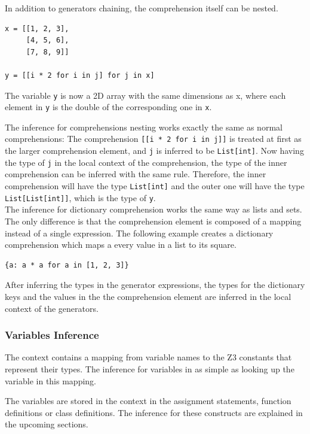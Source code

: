 In addition to generators chaining, the comprehension itself can be nested.
\begin{lstlisting}
x = [[1, 2, 3],
     [4, 5, 6],
     [7, 8, 9]]
	 
y = [[i * 2 for i in j] for j in x]	 
\end{lstlisting}

The variable \lstinline|y| is now a 2D array with the same dimensions as x, where each element in \lstinline|y| is the double of the corresponding one in \lstinline|x|.

The inference for comprehensions nesting works exactly the same as normal comprehensions: The comprehension \lstinline|[[i * 2 for i in j]]| is treated at first as the larger comprehension element, and \lstinline|j| is inferred to be \lstinline|List[int]|. Now having the type of \lstinline|j| in the local context of the comprehension, the type of the inner comprehension can be inferred with the same rule. Therefore, the inner comprehension will have the type \lstinline|List[int]| and the outer one will have the type \lstinline|List[List[int]]|, which is the type of \lstinline|y|.\\

The inference for dictionary comprehension works the same way as lists and sets. The only difference is that the comprehension element is composed of a mapping instead of a single expression. The following example creates a dictionary comprehension which maps a every value in a list to its square.
\begin{lstlisting}
{a: a * a for a in [1, 2, 3]}
\end{lstlisting}

After inferring the types in the generator expressions, the types for the dictionary keys and the values in the the comprehension element are inferred in the local context of the generators.

\subsubsection{Variables Inference}
The context contains a mapping from variable names to the Z3 constants that represent their types. The inference for variables in as simple as looking up the variable in this mapping.

The variables are stored in the context in the assignment statements, function definitions or class definitions. The inference for these constructs are explained in the upcoming sections.

